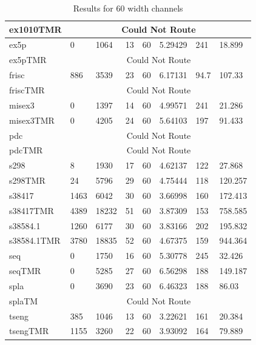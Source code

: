 \documentclass[12pt,final,oneside]{dwThesis} %
\begin{document}
\begin{table}
\begin{adjustwidth}{-1cm}{-1.2cm}
\begin{tabularx}{1.1\textwidth}{llllp{1.5cm}p{2.2cm}p{1.5cm}X}
            ex1010TMR & \multicolumn{7}{c}{Could Not Route}\\\midrule
            ex5p & 0 & 1064 & 13 & 60 & 5.29429 & 241 & 18.899\\
            ex5pTMR & \multicolumn{7}{c}{Could Not Route}\\\midrule
            frisc & 886 & 3539 & 23 & 60 & 6.17131 & 94.7 & 107.33\\
            friscTMR & \multicolumn{7}{c}{Could Not Route} \\\midrule
            misex3 & 0 & 1397 & 14 & 60 & 4.99571 & 241 & 21.286\\
            misex3TMR & 0 & 4205 & 24 & 60 & 5.64103 & 197 & 91.433\\\midrule
            pdc & \multicolumn{7}{c}{Could Not Route} \\
            pdcTMR & \multicolumn{7}{c}{Could Not Route} \\\midrule
            s298 & 8 & 1930 & 17 & 60 & 4.62137 & 122 & 27.868\\
            s298TMR & 24 & 5796 & 29 & 60 & 4.75444 & 118 & 120.257\\\midrule
            s38417 & 1463 & 6042 & 30 & 60 & 3.66998 & 160 & 172.413\\
            s38417TMR & 4389 & 18232 & 51 & 60 & 3.87309 & 153 & 758.585\\\midrule
            s38584.1 & 1260 & 6177 & 30 & 60 & 3.83166 & 202 & 195.832\\
            s38584.1TMR & 3780 & 18835 & 52 & 60 & 4.67375 & 159 & 944.364\\\midrule
            seq & 0 & 1750 & 16 & 60 & 5.30778 & 245 & 32.426\\
            seqTMR & 0 & 5285 & 27 & 60 & 6.56298 & 188 & 149.187\\\midrule
            spla & 0 & 3690 & 23 & 60 & 6.46323 & 188 & 86.03\\
            splaTM & \multicolumn{7}{c}{Could Not Route}\\\midrule
            tseng & 385 & 1046 & 13 & 60 & 3.22621 & 161 & 20.384\\
            tsengTMR & 1155 & 3260 & 22 & 60 & 3.93092 & 164 & 79.889\\\bottomrule
         \end{tabularx}
         \caption{Results for 60 width channels}
         \label{Results60}
      \end{adjustwidth}
   \end{table}
\end{document}
